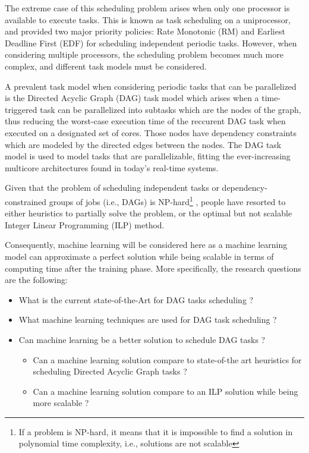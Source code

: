 The extreme case of this scheduling problem arises when only one 
processor is available to execute tasks. This is known as task 
scheduling on a uniprocessor, and \cite{liu1973scheduling} 
provided two major priority policies: Rate Monotonic (RM) and 
Earliest Deadline First (EDF) for scheduling independent periodic tasks. 
However, when considering multiple processors, the scheduling 
problem becomes much more complex, and different task models must 
be considered.

A prevalent task model when considering periodic tasks that can be parallelized is the 
Directed Acyclic Graph (DAG) task model which arises when a time-triggered task
can be parallelized into subtasks which are the nodes of the graph,
thus reducing the worst-case execution time of the reccurent DAG task when executed on a designated set of cores.
Those nodes have dependency constraints which are modeled by the directed edges between the nodes.
The DAG task model is used to model tasks that are parallelizable\cite{baruah2012DAGdef},
fitting the ever-increasing multicore architectures found in today's real-time systems. 

Given that the problem of scheduling independent tasks or dependency-constrained groups of jobs (i.e., DAGs) is NP-hard\footnote{If a problem is 
NP-hard, it means that it is impossible to find a solution in 
polynomial time complexity, i.e., solutions are not scalable}\cite{du1989schedNPhard}
\cite{ULLMAN1975NPhard}, 
people have resorted to either heuristics 
to partially solve the problem,
or the optimal but not scalable Integer Linear Programming
(ILP) method.

Consequently, machine learning will be considered here as 
a machine learning model can 
approximate a perfect solution while being 
scalable in terms of computing time after the training phase\cite{Zhao2024GATDRLmodel}\cite{Lee2021GlobalDagSchedDRL}. 
More specifically, the research questions are the following:

\begin{itemize}
    \item [RQ1] What is the current state-of-the-Art for DAG tasks scheduling ?        
    \item [RQ2] What machine learning  techniques are used for DAG task scheduling ?
    \item [RQ3]  Can machine learning be a better solution to schedule DAG tasks ?
            \begin{itemize}
                \item [RQ3.1] Can a machine learning solution compare to state-of-the art heuristics for scheduling Directed Acyclic Graph tasks ?
                \item [RQ3.2] Can a machine learning solution compare to an ILP solution while being more scalable ?
            \end{itemize}    
\end{itemize}

